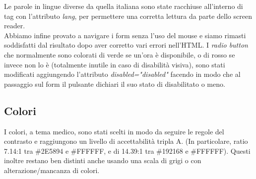 Le parole in lingue diverse da quella italiana sono state racchiuse all'interno di tag con l'attributo \textit{lang}, per permettere una corretta lettura da parte dello screen reader.\\


Abbiamo infine provato a navigare i form senza l’uso del mouse e siamo rimasti soddisfatti dal risultato dopo aver corretto vari errori nell’HTML.
I \textit{radio button} che normalmente sono colorati di verde se un’ora è disponibile, o di rosso se invece non lo è (totalmente inutile in caso di disabilità visiva), sono stati modificati aggiungendo l'attributo \textit{disabled="disabled"} facendo in modo che al passaggio sul form il pulsante dichiari il suo stato di disabilitato o meno.

\pagebreak

\subsection{Colori}

I colori, a tema medico, sono stati scelti in modo da seguire le regole del contrasto e raggiungono un livello di accettabilità tripla A. (In particolare, ratio 7.14:1 tra \#2E5894 e \#FFFFFF, e di 14.39:1 tra \#192168 e \#FFFFFF).
Questi inoltre restano ben distinti anche usando una scala di grigi o con alterazione/mancanza di colori.\\

\begin{center}
\end{center}

\bigskip

